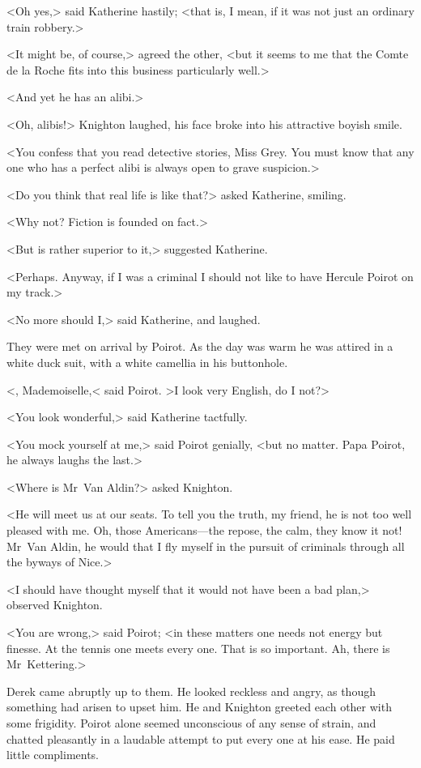 <Oh yes,> said Katherine hastily; <that is, I mean, if it was not just an ordinary train robbery.>

<It might be, of course,> agreed the other, <but it seems to me that the Comte de la Roche fits into this business particularly well.>

<And yet he has an alibi.>

<Oh, alibis!> Knighton laughed, his face broke into his attractive boyish smile.

<You confess that you read detective stories, Miss Grey. You must know that any one who has a perfect alibi is always open to grave suspicion.>

<Do you think that real life is like that?> asked Katherine, smiling.

<Why not? Fiction is founded on fact.>

<But is rather superior to it,> suggested Katherine.

<Perhaps. Anyway, if I was a criminal I should not like to have Hercule Poirot on my track.>

<No more should I,> said Katherine, and laughed.

They were met on arrival by Poirot. As the day was warm he was attired in a white duck suit, with a white camellia in his buttonhole.

<, Mademoiselle,< said Poirot. >I look very English, do I not?>

<You look wonderful,> said Katherine tactfully.

<You mock yourself at me,> said Poirot genially, <but no matter. Papa Poirot, he always laughs the last.>

<Where is Mr~Van Aldin?> asked Knighton.

<He will meet us at our seats. To tell you the truth, my friend, he is not too well pleased with me. Oh, those Americans—the repose, the calm, they know it not! Mr~Van Aldin, he would that I fly myself in the pursuit of criminals through all the byways of Nice.>

<I should have thought myself that it would not have been a bad plan,> observed Knighton.

<You are wrong,> said Poirot; <in these matters one needs not energy but finesse. At the tennis one meets every one. That is so important. Ah, there is Mr~Kettering.>

Derek came abruptly up to them. He looked reckless and angry, as though something had arisen to upset him. He and Knighton greeted each other with some frigidity. Poirot alone seemed unconscious of any sense of strain, and chatted pleasantly in a laudable attempt to put every one at his ease. He paid little compliments.

